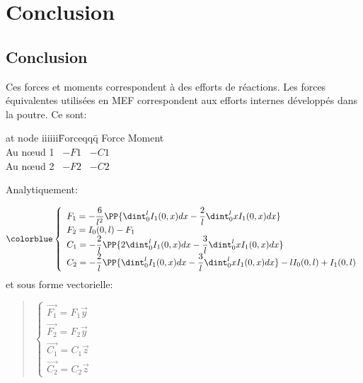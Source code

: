 \medskip
\ifVersionAvecExemplesSepares
   \section{Conclusion}
\else
   \subsection{Conclusion}
\fi

Ces forces et moments correspondent à des efforts de réactions.
Les forces équivalentes utilisées en MEF correspondent aux efforts internes
développés dans la poutre. Ce sont:

\begin{tabbing}
   at node iiiiii\=Forceqqq\=  \kill
             \>Force \>Moment\\
   Au nœud 1 \> ~$-F1$ \> ~$-C1$\\
   Au nœud 2 \> ~$-F2$ \> ~$-C2$\\
\end{tabbing}

Analytiquement:

\begin{equation}\colorblue
\label{Feq}\left\{
\begin{array}{l}
   F_1=-\dfrac 6{l^2}\PP{\dint_0^lI_1(0,x)dx-\dfrac 2l\dint_0^lxI_1(0,x)dx} \\
   F_2=I_0(0,l)-F_1 \\
   C_1=-\dfrac 2l\PP{2\dint_0^lI_1(0,x)dx-\dfrac3l\dint_0^lxI_1(0,x)dx} \\
   C_2=-\dfrac 2l\PP{\dint_0^lI_1(0,x)dx-\dfrac3l\dint_0^lxI_1(0,x)dx}
   -lI_0(0,l)+I_1(0,l)
\end{array}
\right.
\end{equation}
et sous forme vectorielle:

\begin{quotation}
$\left\{
\begin{array}{l}
   \overrightarrow{F_1}=F_1\overrightarrow{y} \\
   \overrightarrow{F_2}=F_2\overrightarrow{y} \\
   \overrightarrow{C_1}=C_1\overrightarrow{z} \\
   \overrightarrow{C_2}=C_2\overrightarrow{z}
\end{array}
\right. $
\end{quotation}


